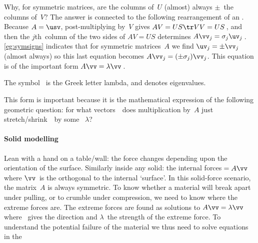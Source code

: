 Why, for symmetric matrices, are the columns of~\(U\) (almost) always \(\pm\)~the columns of~\(V\)?
The answer is connected to the following rearrangement of an \svd.  
Because \(A=\usv\), post-multiplying by~\(V\) gives \(AV=US\tr VV=US\)\,, and then the \(j\)th~column of the two sides of \(AV=US\) determines \(A\vv_j=\sigma_j\uv_j\)\,.
\autoref{eg:symsigns} indicates that for symmetric matrices~\(A\) we  find \(\uv_j=\pm\vv_j\) (almost always) so this last equation becomes \(A\vv_j=(\pm \sigma_j)\vv_j\).
This equation is of the important form \(A\vv=\lambda\vv\)\,.
\begin{aside}
The symbol~\bfidx{$\lambda$} is the Greek letter lambda, and denotes eigenvalues.
\end{aside}%
This form is important because it is the mathematical expression of the following geometric question: for what vectors~\vv\ does multiplication by~\(A\) just stretch\slash shrink~\vv\ by some ~\(\lambda\)?

\begin{comment}
Dynamics of two masses on a spring (relate to molecular vibrations), and seek solutions in~\(\cos(ft)\) for eigenvalue \(\lambda=f^2\).  
As done for three masses in \autoref{eg:eig3vib}---if not omitted.  
Say symmetry from equal and opposite, claim holds even for gigantic structures with millions of interacting components.
\end{comment}


\paragraph{Solid modelling} Lean with a hand on a table\slash wall: the force changes depending upon the orientation of the surface.  
Similarly inside any solid: the internal forces\({}=A\vv\) where \(\vv\)~is the orthogonal  to the internal `surface'.  
In this solid-force scenario, the matrix~\(A\) is always symmetric.  
To know whether a material will break apart under pulling, or to crumble under compression, we need to know where the extreme forces are.  
The extreme forces are found as solutions to \(A\vv=\lambda\vv\) where \vv~gives the direction and \(\lambda\)~the strength of the extreme force.
To understand the potential failure of the material we thus need to solve equations in the 




\endinput

